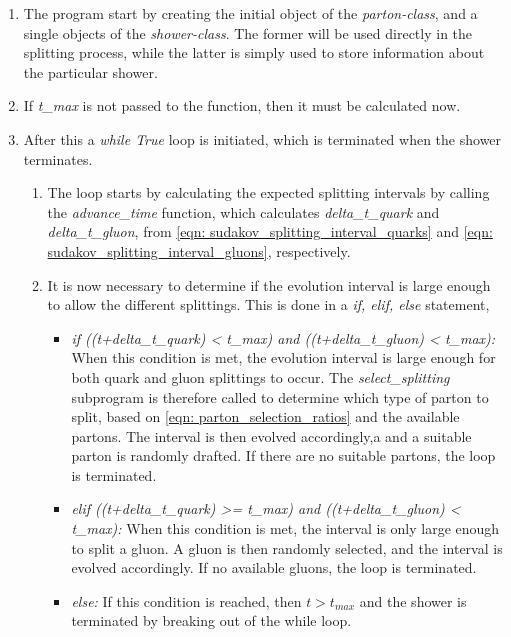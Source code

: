 \documentclass[main.tex]{subfiles}
\begin{document}
\begin{enumerate}[Step 1:]
    \item The program start by creating the initial object of the \textit{parton-class}, and a single objects of the \textit{shower-class}. The former will be used directly in the splitting process, while the latter is simply used to store information about the particular shower.
    \item If \textit{t\_max} is not passed to the function, then it must be calculated now.
    \item After this a \textit{while True} loop is initiated, which is terminated when the shower terminates.

    \begin{enumerate}[{while} i)]
    \item The loop starts by calculating the expected splitting intervals by calling the \textit{advance\_time} function, which calculates \textit{delta\_t\_quark} and \textit{delta\_t\_gluon}, from \autoref{eqn: sudakov_splitting_interval_quarks} and \autoref{eqn: sudakov_splitting_interval_gluons}, respectively.
    \item It is now necessary to determine if the evolution interval is large enough to allow the different splittings. This is done in a \textit{if, elif, else} statement,
    \begin{itemize}
        \item \textit{if ((t+delta\_t\_quark) < t\_max) and ((t+delta\_t\_gluon) < t\_max):}\newline
        When this condition is met, the evolution interval is large enough for both quark and gluon splittings to occur. The \textit{select\_splitting} subprogram is therefore called to determine which type of parton to split, based on \autoref{eqn: parton_selection_ratios} and the available partons. The interval is then evolved accordingly,a and a suitable parton is randomly drafted. If there are no suitable partons, the loop is terminated.
        \item \textit{elif ((t+delta\_t\_quark) >= t\_max) and ((t+delta\_t\_gluon) < t\_max):} \newline
        When this condition is met, the interval is only large enough to split a gluon. A gluon is then randomly selected, and the interval is evolved accordingly. If no available gluons, the loop is terminated.
        \item \textit{else:} \newline
        If this condition is reached, then \(t>t_{max}\) and the shower is terminated by breaking out of the while loop.

\end{itemize}
\end{enumerate}
\end{enumerate}
\end{document}
